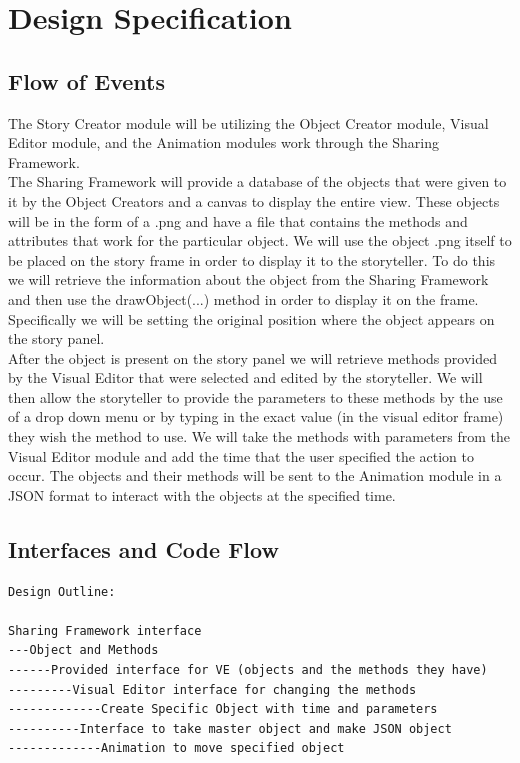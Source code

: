 \documentclass[12pt]{article}
\begin{document}
\section{Design Specification}
	\subsection{Flow of Events}
	
The Story Creator module will be utilizing the Object Creator module, Visual Editor module, and the Animation modules work through the Sharing Framework.\\

The Sharing Framework will provide a database of the objects that were given to it by the Object Creators and a canvas to display the entire view.  These objects will be in the form of a .png and have a file that contains the methods and attributes that work for the particular object.  We will use the object .png itself to be placed on the story frame in order to display it to the storyteller.  To do this we will retrieve the information about the object from the Sharing Framework and then use the drawObject(...) method in order to display it on the frame.  Specifically we will be setting the original position where the object appears on the story panel.  \\

After the object is present on the story panel we will retrieve methods provided by the Visual Editor that were selected and edited by the storyteller.  We will then allow the storyteller to provide the parameters to these methods by the use of a drop down menu or by typing in the exact value (in the visual editor frame) they wish the method to use.  We will take the methods with parameters from the Visual Editor module and add the time that the user specified the action to occur.  The objects and their methods will be sent to the Animation module in a JSON format to interact with the objects at the specified time.  \\

\subsection{Interfaces and Code Flow}

\begin{verbatim}
Design Outline:

Sharing Framework interface
---Object and Methods 
------Provided interface for VE (objects and the methods they have)
---------Visual Editor interface for changing the methods 
-------------Create Specific Object with time and parameters 
----------Interface to take master object and make JSON object 
-------------Animation to move specified object 
\end{verbatim}
\end{document}
